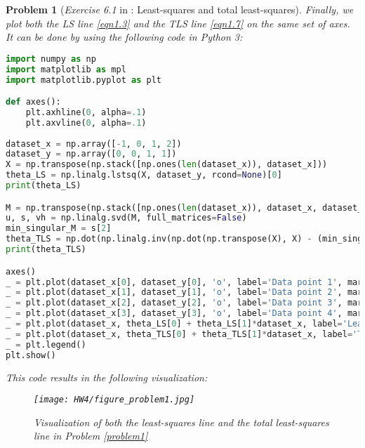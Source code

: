 \documentclass[11pt]{article}
\newtheorem{problem}{Problem}
\numberwithin{equation}{problem}
\begin{document}
\begin{problem} [\emph{Exercise 6.1} in \cite{calafiore2014optimization}: Least-squares and total least-squares]
{\indent Finally, we plot both the \textsf{LS} line \eqref{eqn1.3} and the \textsf{TLS} line \eqref{eqn1.7} on the same set of axes. It can be done by using the following code in Python 3:
\begin{lstlisting}[language = Python]
import numpy as np
import matplotlib as mpl
import matplotlib.pyplot as plt

def axes():
    plt.axhline(0, alpha=.1)
    plt.axvline(0, alpha=.1)
    
dataset_x = np.array([-1, 0, 1, 2])
dataset_y = np.array([0, 0, 1, 1])
X = np.transpose(np.stack([np.ones(len(dataset_x)), dataset_x]))
theta_LS = np.linalg.lstsq(X, dataset_y, rcond=None)[0]
print(theta_LS)

M = np.transpose(np.stack([np.ones(len(dataset_x)), dataset_x, dataset_y]))
u, s, vh = np.linalg.svd(M, full_matrices=False)
min_singular_M = s[2]
theta_TLS = np.dot(np.linalg.inv(np.dot(np.transpose(X), X) - (min_singular_M**2)*np.identity(2)), np.dot(np.transpose(X), dataset_y))
print(theta_TLS)

axes()
_ = plt.plot(dataset_x[0], dataset_y[0], 'o', label='Data point 1', markersize=4)
_ = plt.plot(dataset_x[1], dataset_y[1], 'o', label='Data point 2', markersize=4)
_ = plt.plot(dataset_x[2], dataset_y[2], 'o', label='Data point 3', markersize=4)
_ = plt.plot(dataset_x[3], dataset_y[3], 'o', label='Data point 4', markersize=4)
_ = plt.plot(dataset_x, theta_LS[0] + theta_LS[1]*dataset_x, label='Least-squares line')
_ = plt.plot(dataset_x, theta_TLS[0] + theta_TLS[1]*dataset_x, label='Total least-squares line')
_ = plt.legend()
plt.show()
\end{lstlisting}
This code results in the following visualization:
\begin{figure}[h]
    \centering
    \texttt{[image: HW4/figure\_problem1.jpg]}
    \caption{Visualization of both the least-squares line and the total least-squares line in Problem \ref{problem1}}
    \label{fig:problem_1}
\end{figure}
}
\end{problem}
\end{document}
